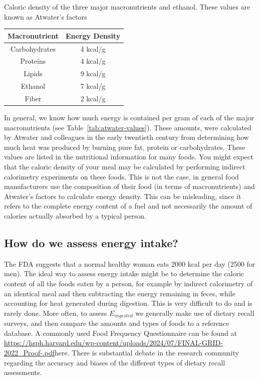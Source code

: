 \documentclass{tufte-handout}
\begin{document}
\begin{margintable}
\centering
\caption{Caloric density of the three major macronutrients and ethanol.  These values are known as Atwater's factors}\label{tab:atwater-values}
\begin{tabular}{cc}
\hline
\textbf{Macronutrient}       & \textbf{Energy Density}                     \\
\hline
Carbohydrates & 4 kcal/g \\
Proteins & 4 kcal/g \\
Lipids & 9 kcal/g \\
Ethanol & 7 kcal/g \\
Fiber & 2 kcal/g \\

\hline
\end{tabular}
\end{margintable}

In general, we know how much energy is contained per gram of each of the major macronutrients (see Table~\ref{tab:atwater-values}).  These amounts, were calculated by Atwater and colleagues in the early twentieth century from determining how much heat was produced by burning pure fat, protein or carbohydrates.  These values are listed in the nutritional information for many foods.  You might expect that the caloric density of your meal may be calculated by performing indirect calorimetry experiments on these foods.  This is not the case, in general food manufacturers use the composition of their food (in terms of macronutrients) and Atwater's factors to calculate energy density.  This can be misleading, since it refers to the complete energy content of a fuel and not necessarily the amount of calories actually absorbed by a typical person.  

\subsection{How do we assess energy intake?}

The FDA suggests that a normal healthy woman eats 2000 kcal per day (2500 for men).  The ideal way to assess energy intake might be to determine the caloric content of all the foods eaten by a person, for example by indirect calorimetry of an identical meal and then subtracting the energy remaining in feces, while accounting for heat generated during digestion.  This is very difficult to do and is rarely done.   More often, to assess $E_{ingested}$ we generally make use of dietary recall surveys, and then compare the amounts and types of foods to a reference database.  A commonly used Food Frequency Questionnaire can be found at \url{https://hsph.harvard.edu/wp-content/uploads/2024/07/FINAL-GRID-2022_Proof-.pdf}{here}.  There is substantial debate in the research community regarding the accuracy and biases of the different types of dietary recall assessments.
\end{document}
